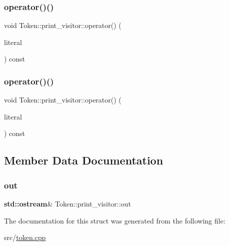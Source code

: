 \mbox{\label{struct_token_1_1print__visitor_a495929c1887c05a00f116c19107dab75}} 
\subsubsection{\texorpdfstring{operator()()}{operator()()}\hspace{0.1cm}{\footnotesize\ttfamily [8/9]}}
{\footnotesize\ttfamily void Token\+::print\+\_\+visitor\+::operator() (\begin{DoxyParamCaption}\item[{const String\+Literal \&}]{literal }\end{DoxyParamCaption}) const\hspace{0.3cm}{\ttfamily [inline]}}

\mbox{\label{struct_token_1_1print__visitor_a7507bdda946c495193de27afd742572f}} 
\subsubsection{\texorpdfstring{operator()()}{operator()()}\hspace{0.1cm}{\footnotesize\ttfamily [9/9]}}
{\footnotesize\ttfamily void Token\+::print\+\_\+visitor\+::operator() (\begin{DoxyParamCaption}\item[{const Regular\+Expression\+Literal \&}]{literal }\end{DoxyParamCaption}) const\hspace{0.3cm}{\ttfamily [inline]}}



\subsection{Member Data Documentation}
\mbox{\label{struct_token_1_1print__visitor_a9b32ad27a09d9c03df39a1b11bb6d638}} 
\subsubsection{\texorpdfstring{out}{out}}
{\footnotesize\ttfamily \textbf{ std\+::ostream}\& Token\+::print\+\_\+visitor\+::out}



The documentation for this struct was generated from the following file\+:\begin{DoxyCompactItemize}
\item 
src/\hyperlink{token_8cpp}{token.\+cpp}\end{DoxyCompactItemize}
